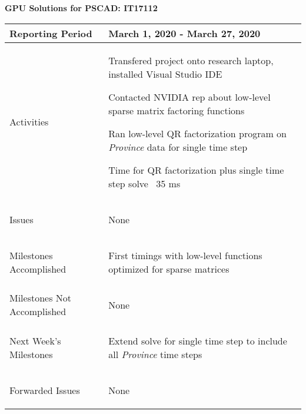 \documentclass[11pt,letterpaper]{article}
\begin{document}
\vspace{.2in}
\begin{center}
    {\bf GPU Solutions for PSCAD: IT17112}
\end{center}

	\vspace{.25in}

\begin{tabular}{| p{} | p{} |}
	\hline
	Reporting Period & March 1, 2020 - March 27, 2020 \\ \hline

	Activities & \begin{enumerate*}
	\item[\tiny\textbullet] Transfered project onto research laptop, installed Visual Studio IDE \newline
	\item[\tiny\textbullet] Contacted NVIDIA rep about low-level sparse matrix factoring functions \newline
	\item[\tiny\textbullet] Ran low-level QR factorization program on \emph{Province} data for single time step \newline
	\item[\tiny\textbullet] Time for QR factorization plus single time step solve ~35 ms
	\end{enumerate*} \\ \hline

	Issues & \begin{enumerate*}
	\item[\tiny\textbullet] None
	\end{enumerate*} \\ \hline

	Milestones \newline Accomplished & \begin{enumerate*}
	\item[\tiny\textbullet] First timings with low-level functions optimized for sparse matrices
	\end{enumerate*} \\ \hline

	Milestones Not \newline Accomplished & \begin{enumerate*}
	\item[\tiny\textbullet] None
	\end{enumerate*} \\ \hline

	Next Week's \newline Milestones & \begin{enumerate*}
	\item[\tiny\textbullet] Extend solve for single time step to include all \emph{Province} time steps
	\end{enumerate*} \\ \hline

	Forwarded Issues & \begin{enumerate*}
	\item[\tiny\textbullet] None
	\end{enumerate*} \\ \hline
\end{tabular}
\end{document}
